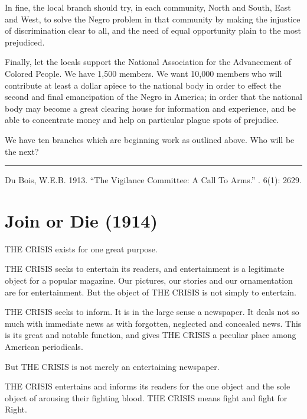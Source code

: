 \documentclass[letterpaper,10pt,english]{jupyterBook}
\begin{document}
\sphinxAtStartPar
In fine, the local branch should try, in each community, North and South, East and West, to solve the Negro problem in that community by making the injustice of discrimination clear to all, and the need of equal opportunity plain to the most prejudiced.

\sphinxAtStartPar
Finally, let the locals support the National Association for the Advancement of Colored People. We have 1,500 members. We want 10,000 members who will contribute at least a dollar apiece to the national body in order to effect the second and final emancipation of the Negro in America; in order that the national body may become a great clearing house for information and experience, and be able to concentrate money and help on particular plague spots of prejudice.

\sphinxAtStartPar
We have ten branches which are beginning work as outlined above. Who will be the next?


\bigskip\hrule\bigskip


\sphinxAtStartPar
{} Du Bois, W.E.B. 1913. “The Vigilance Committee: A Call To Arms.” . 6(1): 26\sphinxhyphen{}29.


\section{Join or Die (1914)}
\label{\detokenize{Volumes/07/03/fightordie:join-or-die-1914}}\label{\detokenize{Volumes/07/03/fightordie::doc}}
\sphinxAtStartPar
THE CRISIS exists for one great purpose.

\sphinxAtStartPar
THE CRISIS seeks to entertain its readers, and entertainment is a legitimate object for a popular magazine. Our pictures, our stories and our ornamentation are for entertainment. But the object of THE CRISIS is not simply to entertain.

\sphinxAtStartPar
THE CRISIS seeks to inform. It is in the large sense a newspaper. It deals not so much with immediate news as with forgotten, neglected and concealed news. This is its great and notable
function, and gives THE CRISIS a peculiar place among American periodicals.

\sphinxAtStartPar
But THE CRISIS is not merely an entertaining newspaper.

\sphinxAtStartPar
THE CRISIS entertains and informs its readers for the one object and the sole object of arousing their fighting blood. THE CRISIS means fight and fight for Right.
\end{document}
